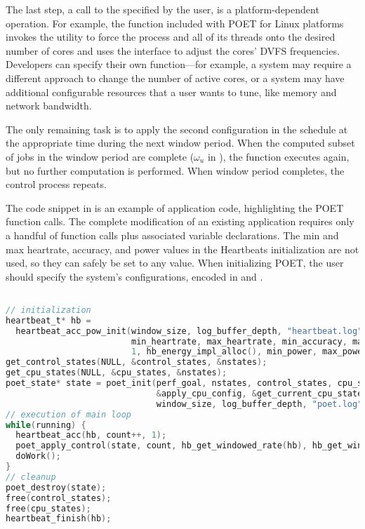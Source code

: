 The last step, a call to the  specified by the user, is a platform-dependent operation.
For example, the function included with POET for Linux platforms invokes the  utility to force the process and all of its threads onto the desired number of cores and uses the  interface to adjust the cores' DVFS frequencies.
Developers can specify their own function---for example, a system may require a different approach to change the number of active cores, or a system may have additional configurable resources that a user wants to tune, like memory and network bandwidth.

The only remaining task is to apply the second configuration in the schedule at the appropriate time during the next window period.
When the computed subset of jobs in the window period are complete ($\omega_u$ in ), the  function executes again, but no further computation is performed.
When window period completes, the control process repeats.

The code snippet in  is an example of application code, highlighting the POET function calls.
The complete modification of an existing application requires only a handful of function calls plus associated variable declarations.
The min and max heartrate, accuracy, and power values in the Heartbeats initialization are not used, so they can safely be set to any value.
When initializing POET, the user should specify the system's configurations, encoded in  and .

%
\begin{lstlisting}[language=C,%
  caption={Example of POET application code.},%
  label={lst:poet-example}]%

// initialization
heartbeat_t* hb =
  heartbeat_acc_pow_init(window_size, log_buffer_depth, "heartbeat.log",
                         min_heartrate, max_heartrate, min_accuracy, max_accuracy,
                         1, hb_energy_impl_alloc(), min_power, max_power);
get_control_states(NULL, &control_states, &nstates);
get_cpu_states(NULL, &cpu_states, &nstates);
poet_state* state = poet_init(perf_goal, nstates, control_states, cpu_states,
                              &apply_cpu_config, &get_current_cpu_state,
                              window_size, log_buffer_depth, "poet.log");
// execution of main loop
while(running) {
  heartbeat_acc(hb, count++, 1);
  poet_apply_control(state, count, hb_get_windowed_rate(hb), hb_get_windowed_power(hb));
  doWork();
}
// cleanup
poet_destroy(state);
free(control_states);
free(cpu_states);
heartbeat_finish(hb);
\end{lstlisting}
